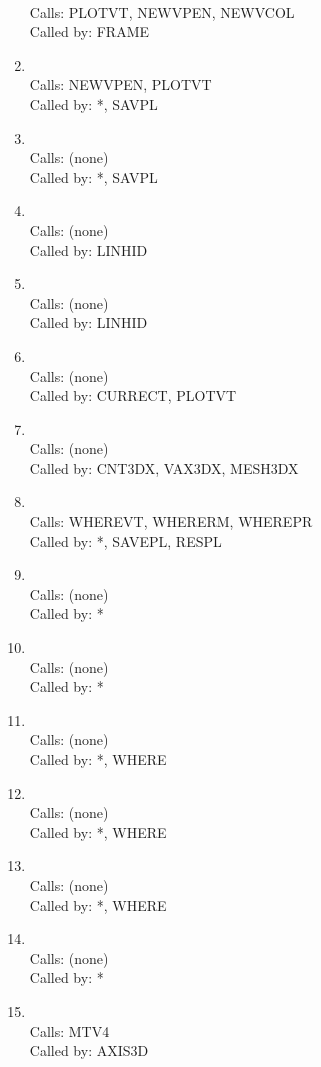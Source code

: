 \documentclass[11pt]{report}
\begin{document}
\begin{enumerate}
\\ Calls:  PLOTVT, NEWVPEN, NEWVCOL
\\ Called by: FRAME
\item {}
\\ Calls:  NEWVPEN, PLOTVT
\\ Called by: *, SAVPL
\item {}
\\ Calls:  (none)
\\ Called by: *, SAVPL
\item {}
\\ Calls:  (none)
\\ Called by: LINHID
\item {}
\\ Calls:  (none)
\\ Called by: LINHID
\item {}
\\ Calls:  (none)
\\ Called by: CURRECT, PLOTVT
\item {}
\\ Calls:  (none)
\\ Called by: CNT3DX, VAX3DX, MESH3DX
\item {}
\\ Calls:  WHEREVT, WHERERM, WHEREPR
\\ Called by: *, SAVEPL, RESPL
\item {}
\\ Calls:  (none)
\\ Called by: *
\item {}
\\ Calls:  (none)
\\ Called by: *
\item {}
\\ Calls:  (none)
\\ Called by: *, WHERE
\item {}
\\ Calls:  (none)
\\ Called by: *, WHERE
\item {}
\\ Calls:  (none)
\\ Called by: *, WHERE
\item {}
\\ Calls:  (none)
\\ Called by: *
\item {}
\\ Calls:   MTV4
\\ Called by: AXIS3D
\end{enumerate}
\end{document}
